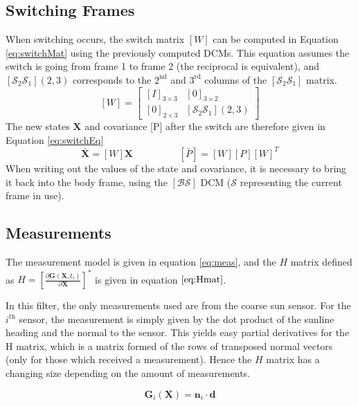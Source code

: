 \documentclass[]{BasiliskReportMemo}
\begin{document}
\subsection{Switching Frames} %

When switching occurs, the switch matrix $[W]$ can be computed in Equation \eqref{eq:switchMat} using the previously computed DCMs. This equation assumes the switch is going from frame 1 to frame 2 (the reciprocal is equivalent), and $[\mathcal{S}_2 \mathcal{S}_1](2,3)$ corresponds to the $2^{\text{nd}}$ and $3^{\text{rd}}$ columns of the $[\mathcal{S}_2 \mathcal{S}_1]$ matrix. 
\begin{equation}\label{eq:switchMat}
[W] = \begin{bmatrix} [I]_{3\times 3} & [0]_{3 \times 2} \\ [0]_{2 \times 3} & [\mathcal{S}_2 \mathcal{S}_1](2,3)\end{bmatrix}
\end{equation}
The new states $\bm X$ and covariance [P] after the switch are therefore given in Equation \eqref{eq:switchEq}
\begin{equation}\label{eq:switchEq}
\bar{\bm X} = [W] \bm X \hspace{2cm} [\bar{P}] = [W] [P] [W]^T
\end{equation}
When writing out the values of the state and covariance, it is necessary to bring it back into the body frame, using the $[\mathcal{B}\mathcal{S}]$ DCM ($\mathcal{S}$ representing the current frame in use).

\subsection{Measurements}
The measurement model is given in equation \ref{eq:meas}, and the $H$ matrix defined as $H = \left[\frac{\partial \bm G (\bm X, t_i)}{\partial \bm X}\right]^{*}$ is given in equation $\ref{eq:Hmat}$. 

In this filter, the only measurements used are from the coarse sun sensor. For the $i^\mathrm{th}$ sensor, the measurement is simply given by the dot product of the sunline heading and the normal to the sensor. This yields easy partial derivatives for the H matrix, which is a matrix formed of the rows of transposed normal vectors (only for those which received a measurement). Hence the $H$ matrix has a changing size depending on the amount of measurements. 

\begin{equation}\label{eq:meas}
\bm G_i(\bm X) = \bm n_i \cdot \bm d
\end{equation}
\end{document}
